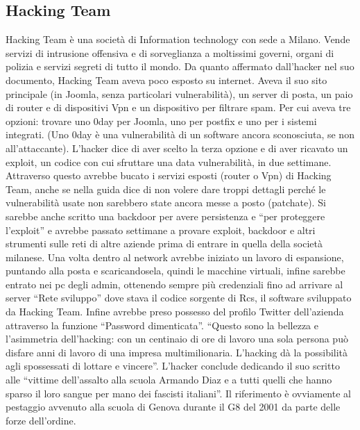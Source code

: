 \documentclass{article}
\begin{document}
\subsection{Hacking Team}
Hacking Team è una società di Information technology con sede a Milano. Vende servizi di intrusione offensiva e di 
sorveglianza a moltissimi governi, organi di polizia e servizi segreti di tutto il mondo. Da quanto affermato 
dall'hacker nel suo documento, Hacking Team aveva poco esposto su internet. Aveva il suo sito principale 
(in Joomla, senza particolari vulnerabilità), un server di posta, un paio di router e di dispositivi 
Vpn e un dispositivo per filtrare spam. Per cui aveva tre opzioni: trovare uno 0day per Joomla, 
uno per postfix e uno per i sistemi integrati. (Uno 0day è una vulnerabilità di un software ancora sconosciuta, se non all’attaccante). 
L’hacker dice di aver scelto la terza opzione e di aver ricavato un exploit, un codice con cui sfruttare una data 
vulnerabilità, in due settimane. Attraverso questo avrebbe bucato i servizi esposti (router o Vpn) di Hacking Team, 
anche se nella guida dice di non volere dare troppi dettagli perché le vulnerabilità usate 
non sarebbero state ancora messe a posto (patchate). Si sarebbe anche scritto una backdoor per avere persistenza 
e “per proteggere l’exploit” e avrebbe passato settimane a provare exploit, backdoor e altri strumenti sulle 
reti di altre aziende prima di entrare in quella della società milanese. Una volta dentro al network avrebbe 
iniziato un lavoro di espansione, puntando alla posta e scaricandosela, quindi le macchine virtuali, 
infine sarebbe entrato nei pc degli admin, ottenendo sempre più credenziali fino ad arrivare al server 
“Rete sviluppo” dove stava il codice sorgente di Rcs, il software sviluppato da Hacking Team. 
Infine avrebbe preso possesso del profilo Twitter dell’azienda attraverso la funzione “Password dimenticata”.
“Questo sono la bellezza e l’asimmetria dell’hacking: con un centinaio di ore di lavoro una sola persona può disfare 
anni di lavoro di una impresa multimilionaria. L’hacking dà la possibilità agli spossessati di lottare e vincere”.
L’hacker conclude dedicando il suo scritto alle “vittime dell’assalto alla scuola Armando Diaz e a tutti quelli 
che hanno sparso il loro sangue per mano dei fascisti italiani”. Il riferimento è ovviamente al pestaggio 
avvenuto alla scuola di Genova durante il G8 del 2001 da parte delle forze dell’ordine.
\end{document}
